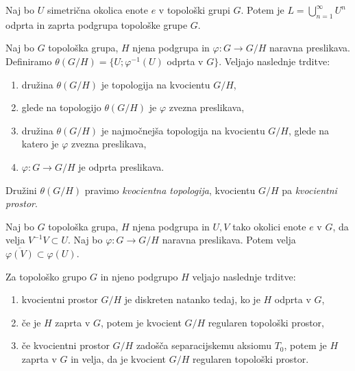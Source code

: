 \documentclass[mat1]{fmfdelo}
\newcommand{\closure}[1]{\overline{#1}}
\begin{document}
\begin{trditev}\label{trd:podgrupaunija}
Naj bo $U$ simetrična okolica enote $e$ v topološki grupi $G$. Potem je $L = \bigcup_{n=1}^{\infty} U^n$ odprta in zaprta podgrupa topološke grupe $G$.
\end{trditev}


\begin{izrek}\label{izr:topkvocienta}
Naj bo $G$ topološka grupa, $H$ njena podgrupa in $\varphi: G \to G/H$ naravna preslikava. Definiramo $\theta(G/H) = \lbrace U ; \varphi^{-1}(U)$ odprta v $G \rbrace$.
Veljajo naslednje trditve:
\begin{enumerate}
\item družina $\theta(G/H)$ je topologija na kvocientu $G/H$,
\item glede na topologijo $\theta(G/H)$ je $\varphi$ zvezna preslikava,
\item družina $\theta(G/H)$ je najmočnejša topologija na kvocientu $G/H$, glede na katero je $\varphi$ zvezna preslikava,
\item $\varphi: G \to G/H$ je odprta preslikava.
\end{enumerate}
\end{izrek}

Družini $\theta(G/H)$ pravimo \emph{kvocientna topologija}, kvocientu $G/H$ pa \emph{kvocientni prostor}.


\begin{trditev}\label{trd:okolicevkvoc}
Naj bo $G$ topološka grupa, $H$ njena podgrupa in $U, V$ tako okolici enote $e$ v $G$, da velja $V^{-1}V \subset U$. Naj bo $\varphi: G \to G/H$ naravna preslikava. Potem velja $\closure{\varphi(V)} \subset \varphi(U)$.
\end{trditev}

\begin{izrek}
Za topološko grupo $G$ in njeno podgrupo $H$ veljajo naslednje trditve:
\begin{enumerate}
\item kvocientni prostor $G/H$ je diskreten natanko tedaj, ko je $H$ odprta v $G$,
\item če je $H$ zaprta v $G$, potem je kvocient $G/H$ regularen topološki prostor,
\item če kvocientni prostor $G/H$ zadošča separacijskemu aksiomu $T_0$, potem je $H$ zaprta v $G$ in velja, da je kvocient $G/H$ regularen topološki prostor.
\end{enumerate}
\end{izrek}
\end{document}
